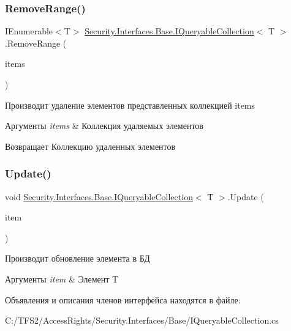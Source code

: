 \subsubsection{\texorpdfstring{Remove\+Range()}{RemoveRange()}}
{\footnotesize\ttfamily I\+Enumerable$<$T$>$ \hyperlink{interface_security_1_1_interfaces_1_1_base_1_1_i_queryable_collection}{Security.\+Interfaces.\+Base.\+I\+Queryable\+Collection}$<$ T $>$.Remove\+Range (\begin{DoxyParamCaption}\item[{I\+Enumerable$<$ T $>$}]{items }\end{DoxyParamCaption})}



Производит удаление элементов представленных коллекцией items 


\begin{DoxyParams}{Аргументы}
{\em items} & Коллекция удаляемых элементов\\
\hline
\end{DoxyParams}
\begin{DoxyReturn}{Возвращает}
Коллекцию удаленных элементов
\end{DoxyReturn}
\mbox{\label{interface_security_1_1_interfaces_1_1_base_1_1_i_queryable_collection_aed78963fa30c2273533e170055d43729}} 
\subsubsection{\texorpdfstring{Update()}{Update()}}
{\footnotesize\ttfamily void \hyperlink{interface_security_1_1_interfaces_1_1_base_1_1_i_queryable_collection}{Security.\+Interfaces.\+Base.\+I\+Queryable\+Collection}$<$ T $>$.Update (\begin{DoxyParamCaption}\item[{T}]{item }\end{DoxyParamCaption})}



Производит обновление элемента в БД 


\begin{DoxyParams}{Аргументы}
{\em item} & Элемент T\\
\hline
\end{DoxyParams}


Объявления и описания членов интерфейса находятся в файле\+:\begin{DoxyCompactItemize}
\item 
C\+:/\+T\+F\+S2/\+Access\+Rights/\+Security.\+Interfaces/\+Base/I\+Queryable\+Collection.\+cs\end{DoxyCompactItemize}
